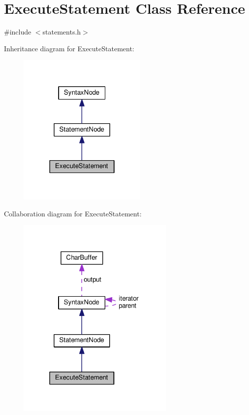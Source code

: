 \hypertarget{classExecuteStatement}{}\section{Execute\+Statement Class Reference}
\label{classExecuteStatement}


{\ttfamily \#include $<$statements.\+h$>$}



Inheritance diagram for Execute\+Statement\+:
\nopagebreak
\begin{figure}[H]
\begin{center}
\leavevmode
\includegraphics[width=178pt]{dc/da3/classExecuteStatement__inherit__graph}
\end{center}
\end{figure}


Collaboration diagram for Execute\+Statement\+:
\nopagebreak
\begin{figure}[H]
\begin{center}
\leavevmode
\includegraphics[width=217pt]{db/d9c/classExecuteStatement__coll__graph}
\end{center}
\end{figure}
